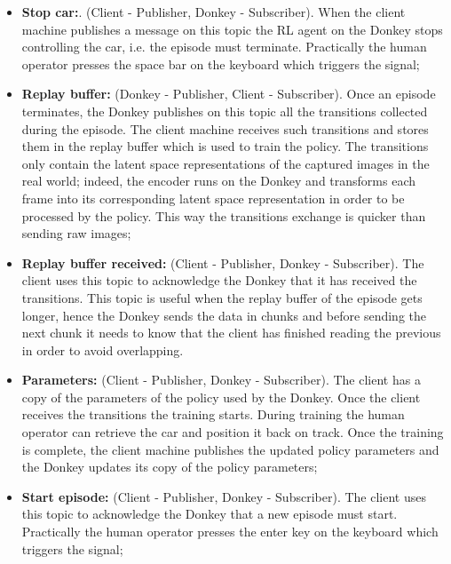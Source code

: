 \begin{itemize}
    \item \textbf{Stop car:}. (Client - Publisher, Donkey - Subscriber). When the client machine publishes a message on this topic the RL agent on the Donkey stops controlling the car, i.e. the episode must terminate. Practically the human operator presses the space bar on the keyboard which triggers the signal;
    \item \textbf{Replay buffer:} (Donkey - Publisher, Client - Subscriber). Once an episode terminates, the Donkey publishes on this topic all the transitions collected during the episode. The client machine receives such transitions and stores them in the replay buffer which is used to train the policy. The transitions only contain the latent space representations of the captured images in the real world; indeed, the encoder runs on the Donkey and transforms each frame into its corresponding latent space representation in order to be processed by the policy. This way the transitions exchange is quicker than sending raw images;
    \item \textbf{Replay buffer received:} (Client - Publisher, Donkey - Subscriber). The client uses this topic to acknowledge the Donkey that it has received the transitions. This topic is useful when the replay buffer of the episode gets longer, hence the Donkey sends the data in chunks and before sending the next chunk it needs to know that the client has finished reading the previous in order to avoid overlapping. 
    \item \textbf{Parameters:} (Client - Publisher, Donkey - Subscriber). The client has a copy of the parameters of the policy used by the Donkey. Once the client receives the transitions the training starts. During training the human operator can retrieve the car and position it back on track. Once the training is complete, the client machine publishes the updated policy parameters and the Donkey updates its copy of the policy parameters;
    \item \textbf{Start episode:} (Client - Publisher, Donkey - Subscriber). The client uses this topic to acknowledge the Donkey that a new episode must start. Practically the human operator presses the enter key on the keyboard which triggers the signal;
\end{itemize}